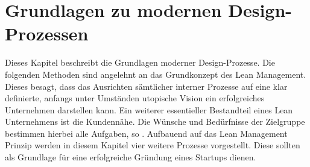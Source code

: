 \chapter{Grundlagen zu modernen Design-Prozessen}
\label{sec:Grundlagen}
Dieses Kapitel beschreibt die Grundlagen moderner Design-Prozesse. Die folgenden Methoden sind angelehnt an das Grundkonzept des Lean Management. Dieses besagt, dass das Ausrichten sämtlicher interner Prozesse auf eine klar definierte, anfangs unter Umständen utopische Vision ein erfolgreiches Unternehmen darstellen kann. Ein weiterer essentieller Bestandteil eines Lean Unternehmens ist die Kundennähe. Die Wünsche und Bedürfnisse der Zielgruppe bestimmen hierbei alle Aufgaben, so . Aufbauend auf das Lean Management Prinzip werden in diesem Kapitel vier weitere Prozesse vorgestellt. Diese sollten als Grundlage für eine erfolgreiche Gründung eines Startups dienen.





